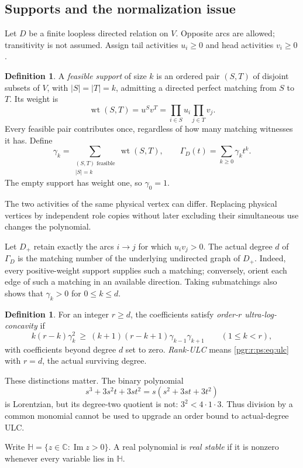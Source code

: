 \documentclass[11pt]{article}
\numberwithin{equation}{section}
\theoremstyle{definition}\newtheorem{definition}[theorem]{Definition}\newtheorem{remark}[theorem]{Remark}
\newcommand{\Ga}{\Gamma}                   %
\newcommand{\HH}{\mathbb H}                %
\newcommand{\wt}{\operatorname{wt}}        %
\begin{document}
\subsection{Supports and the normalization issue}
Let $D$ be a finite loopless directed relation on $V$. Opposite arcs are allowed; transitivity is not assumed. Assign tail activities $u_i\ge0$ and head activities $v_i\ge0$.
\begin{definition}
A \emph{feasible support} of size $k$ is an ordered pair $(S,T)$ of disjoint subsets of $V$, with $|S|=|T|=k$, admitting a directed perfect matching from $S$ to $T$. Its weight is
\[
 \wt(S,T)=u^S v^T=\prod_{i\in S}u_i\prod_{j\in T}v_j.
\]
Every feasible pair contributes once, regardless of how many matching witnesses it has. Define
\[
 \gamma_k=\sum_{\substack{(S,T)\text{ feasible}\\|S|=k}}\wt(S,T),
 \qquad \Ga_D(t)=\sum_{k\ge0}\gamma_k t^k.
\]
The empty support has weight one, so $\gamma_0=1$.
\end{definition}
The two activities of the same physical vertex can differ. Replacing physical vertices by independent role copies without later excluding their simultaneous use changes the polynomial.

Let $D_+$ retain exactly the arcs $i\to j$ for which $u_iv_j>0$. The actual degree $d$ of $\Ga_D$ is the matching number of the underlying undirected graph of $D_+$. Indeed, every positive-weight support supplies such a matching; conversely, orient each edge of such a matching in an available direction. Taking submatchings also shows that $\gamma_k>0$ for $0\le k\le d$.

\begin{definition}
For an integer $r\ge d$, the coefficients satisfy \emph{order-$r$ ultra-log-concavity} if
\begin{equation}\label{pgr:r:ps:eq:ulc}
 k(r-k)\gamma_k^2\ \ge\ (k+1)(r-k+1)\gamma_{k-1}\gamma_{k+1}
 \qquad(1\le k<r),
\end{equation}
with coefficients beyond degree $d$ set to zero. \emph{Rank-ULC} means \eqref{pgr:r:ps:eq:ulc} with $r=d$, the actual surviving degree.
\end{definition}
These distinctions matter. The binary polynomial
\[
 s^3+3s^2t+3st^2=s(s^2+3st+3t^2)
\]
is Lorentzian, but its degree-two quotient is not: $3^2<4\cdot1\cdot3$. Thus division by a common monomial cannot be used to upgrade an order bound to actual-degree ULC.

Write $\HH=\{z\in\mathbb C:\operatorname{Im}z>0\}$. A real polynomial is \emph{real stable} if it is nonzero whenever every variable lies in $\HH$.
\end{document}

